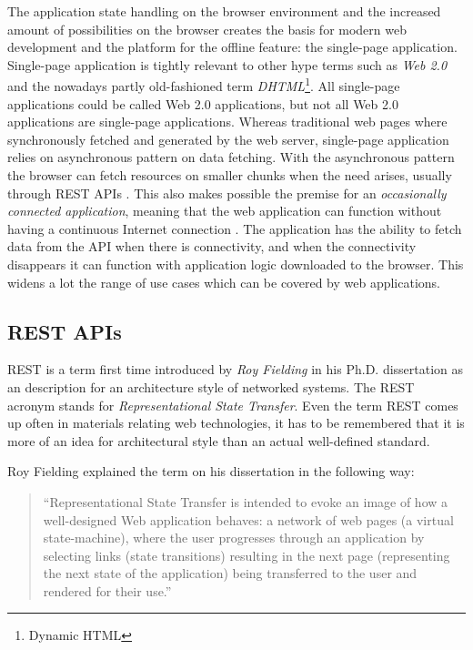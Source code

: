 The application state handling on the browser environment and the increased amount of possibilities on the browser creates the basis for modern web development and the platform for the offline feature: the single-page application. Single-page application is tightly relevant to other hype terms such as \textit{Web 2.0} and the nowadays partly old-fashioned term \textit{DHTML}\footnote{Dynamic HTML}. All single-page applications could be called Web 2.0 applications, but not all Web 2.0 applications are single-page applications. Whereas traditional web pages where synchronously fetched and generated by the web server, single-page application relies on asynchronous pattern on data fetching. \cite{garrett_ajax:_2005} With the asynchronous pattern the browser can fetch resources on smaller chunks when the need arises, usually through REST APIs \cite{masse_rest_2011}. This also makes possible the premise for an \textit{occasionally connected application}, meaning that the web application can function without having a continuous Internet connection \cite{casario_html5_2011}. The application has the ability to fetch data from the API when there is connectivity, and when the connectivity disappears it can function with application logic downloaded to the browser.  This widens a lot the range of use cases which can be covered by web applications.



\subsection{REST APIs}

REST is a term first time introduced by \textit{Roy Fielding} in his Ph.D. dissertation \cite{fielding_architectural_2000} as an description for an architecture style of networked systems. The REST acronym stands for \textit{Representational State Transfer}. Even the term REST comes up often in materials relating web technologies, it has to be remembered that it is more of an idea for architectural style than an actual well-defined standard. 

Roy Fielding explained the term on his dissertation in the following way:
\begin{quote}
	``Representational State Transfer is intended to evoke an image of how a well-designed Web application behaves: a network of web pages (a virtual state-machine), where the user progresses through an application by selecting links (state transitions) resulting in the next page (representing the next state of the application) being transferred to the user and rendered for their use.''
\end{quote}

